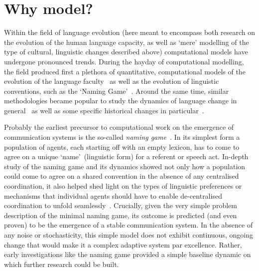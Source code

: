 \section{Why model?}

Within the field of language evolution (here meant to encompass both research on the evolution of the human language capacity, as well as `mere' modelling of the type of cultural, linguistic changes described above) computational models have undergone pronounced trends. %
During the hayday of computational modelling, the field produced first a plethora of quantitative, computational models of the evolution of the language faculty~\citep{Kirby1999,Nowak2001a} as well as the evolution of linguistic conventions, such as the `Naming Game'~\citep[see \citet{Wellens2012} for a review]{Baronchelli2008}. Around the same time, similar methodologies became popular to study the dynamics of language change in general~\citep{Niyogi1995,Niyogi1997,Kataoka2000,Livingstone2000,Niyogi2006,Wedel2006,Baxter2006,Wedel2007,Niyogi2007,Ritt2009,Fagyal2010,Blythe2012,Gong2012,Otero-Espinar2013,Soskuthy2013,Pierrehumbert2014,Enke2016} as well as some specific historical changes in particular~\citep{Yang2002,Baxter2009,Sonderegger2010,Swarup2012,Ritt2012,Kirby2013,Kirby2013cogsci}. %


Probably the earliest precursor to computational work on the emergence of communication systems is the so-called \emph{naming game}~\citep{Steels1998,Steels1999,Baronchelli2006}.
In its simplest form a population of agents, each starting off with an empty lexicon, has to come to agree on a unique `name'~(linguistic form) for a referent or speech act. In-depth study of the naming game and its dynamics showed not only how a population could come to agree on a shared convention in the absence of any centralised coordination, it also helped shed light on the types of linguistic preferences or mechanisms that individual agents should have to enable de-centralised coordination to unfold seamlessly~\citep{DeVylder2006,Wellens2012,Spike2016}. 
Crucially, given the very simple problem description of the minimal naming game, its outcome is predicted (and even proven) to be the emergence of a stable communication system. In the absence of any noise or stochasticity, this simple model does not exhibit continuous, ongoing change that would make it a complex adaptive system par excellence. Rather, early investigations like the naming game provided a simple baseline dynamic on which further research could be built.

